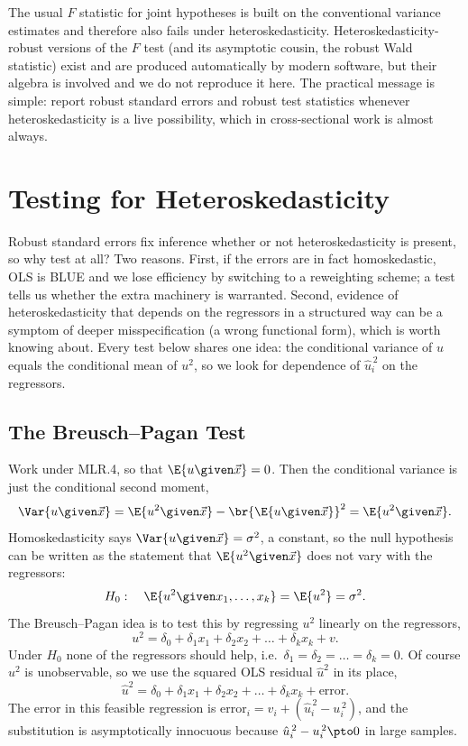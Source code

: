 The usual $F$ statistic for joint hypotheses is built on the conventional variance estimates and therefore also fails under heteroskedasticity. Heteroskedasticity-robust versions of the $F$ test (and its asymptotic cousin, the robust Wald statistic) exist and are produced automatically by modern software, but their algebra is involved and we do not reproduce it here. The practical message is simple: report robust standard errors and robust test statistics whenever heteroskedasticity is a live possibility, which in cross-sectional work is almost always.

\section{Testing for Heteroskedasticity}
\label{sec:tests}

Robust standard errors fix inference whether or not heteroskedasticity is present, so why test at all? Two reasons. First, if the errors are in fact homoskedastic, OLS is BLUE and we lose efficiency by switching to a reweighting scheme; a test tells us whether the extra machinery is warranted. Second, evidence of heteroskedasticity that depends on the regressors in a structured way can be a symptom of deeper misspecification (a wrong functional form), which is worth knowing about. Every test below shares one idea: the conditional variance of $u$ equals the conditional mean of $u^2$, so we look for dependence of $\hat u_i^{\,2}$ on the regressors.

\subsection{The Breusch--Pagan Test}

Work under MLR.4, so that $\E{u \given \vec x} = 0$. Then the conditional variance is just the conditional second moment,
\[
\Var{u \given \vec x} = \E{u^2 \given \vec x} - \br{\E{u \given \vec x}}^2 = \E{u^2 \given \vec x}.
\]
Homoskedasticity says $\Var{u \given \vec x} = \sigma^2$, a constant, so the null hypothesis can be written as the statement that $\E{u^2 \given \vec x}$ does not vary with the regressors:
\[
H_0: \quad \E{u^2 \given x_1,\dots,x_k} = \E{u^2} = \sigma^2.
\]
The Breusch--Pagan idea is to test this by regressing $u^2$ linearly on the regressors,
\[
u^2 = \delta_0 + \delta_1 x_1 + \delta_2 x_2 + \dots + \delta_k x_k + v.
\]
Under $H_0$ none of the regressors should help, i.e.\ $\delta_1 = \delta_2 = \dots = \delta_k = 0$. Of course $u^2$ is unobservable, so we use the squared OLS residual $\hat u^2$ in its place,
\[
\hat u^2 = \delta_0 + \delta_1 x_1 + \delta_2 x_2 + \dots + \delta_k x_k + \text{error}.
\]
The error in this feasible regression is $\text{error}_i = v_i + (\hat u_i^{\,2} - u_i^{\,2})$, and the substitution is asymptotically innocuous because $\hat u_i^{\,2} - u_i^{\,2} \pto 0$ in large samples.

